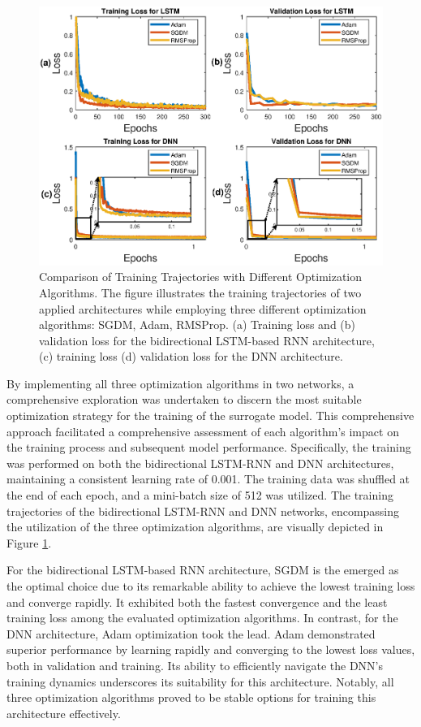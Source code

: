 \begin{figure}[htb]
    \centering
    \includegraphics[width=\linewidth]{img/chap4/comp_op.eps}
    \caption{Comparison of Training Trajectories with Different Optimization Algorithms. The figure illustrates the training trajectories of two applied architectures while employing three different optimization algorithms: \ac{SGDM}, \ac{Adam}, \ac{RMSProp}. (a) Training loss and (b) validation loss for the bidirectional \ac{LSTM}-based \ac{RNN} architecture, (c) training loss (d) validation loss for the \ac{DNN} architecture.}
    \label{fig:comp3op}
\end{figure}

By implementing all three optimization algorithms in two networks, a comprehensive exploration was undertaken to discern the most suitable optimization strategy for the training of the surrogate model. This comprehensive approach facilitated a comprehensive assessment of each algorithm's impact on the training process and subsequent model performance. Specifically, the training was performed on both the bidirectional LSTM-RNN and DNN architectures, maintaining a consistent learning rate of 0.001. The training data was shuffled at the end of each epoch, and a mini-batch size of 512 was utilized. The training trajectories of the bidirectional LSTM-RNN and DNN networks, encompassing the utilization of the three optimization algorithms, are visually depicted in Figure \ref{fig:comp3op}. 

For the bidirectional LSTM-based RNN architecture, SGDM is the emerged as the optimal choice due to its remarkable ability to achieve the lowest training loss and converge rapidly. It exhibited both the fastest convergence and the least training loss among the evaluated optimization algorithms. In contrast, for the DNN architecture, Adam optimization took the lead. Adam demonstrated superior performance by learning rapidly and converging to the lowest loss values, both in validation and training. Its ability to efficiently navigate the DNN's training dynamics underscores its suitability for this architecture. Notably, all three optimization algorithms proved to be stable options for training this architecture effectively.

